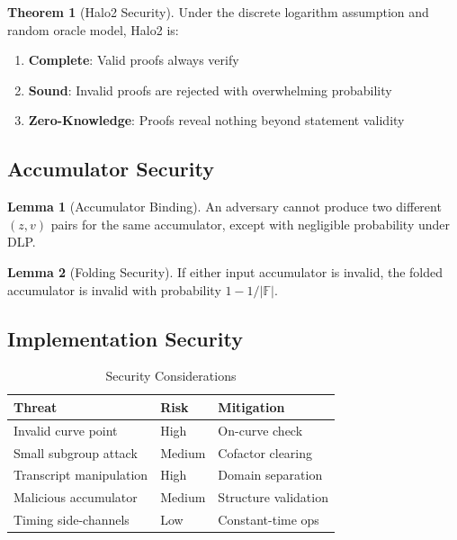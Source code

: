 \documentclass[11pt,a4paper]{article}
\theoremstyle{definition}
\newtheorem{theorem}{Theorem}
\newtheorem{lemma}{Lemma}
\begin{document}
\begin{theorem}[Halo2 Security]
    Under the discrete logarithm assumption and random oracle model, Halo2 is:
    \begin{enumerate}
        \item \textbf{Complete}: Valid proofs always verify
        \item \textbf{Sound}: Invalid proofs are rejected with overwhelming probability
        \item \textbf{Zero-Knowledge}: Proofs reveal nothing beyond statement validity
    \end{enumerate}
\end{theorem}

\subsection{Accumulator Security}

\begin{lemma}[Accumulator Binding]
    An adversary cannot produce two different $(z, v)$ pairs for the same accumulator, except with negligible probability under DLP.
\end{lemma}

\begin{lemma}[Folding Security]
    If either input accumulator is invalid, the folded accumulator is invalid with probability $1 - 1/|\mathbb{F}|$.
\end{lemma}

\subsection{Implementation Security}

\begin{table}[h]
\centering
\caption{Security Considerations}
\begin{tabular}{lll}
\toprule
Threat & Risk & Mitigation \\
\midrule
Invalid curve point & High & On-curve check \\
Small subgroup attack & Medium & Cofactor clearing \\
Transcript manipulation & High & Domain separation \\
Malicious accumulator & Medium & Structure validation \\
Timing side-channels & Low & Constant-time ops \\
\bottomrule
\end{tabular}
\end{table}
\end{document}

